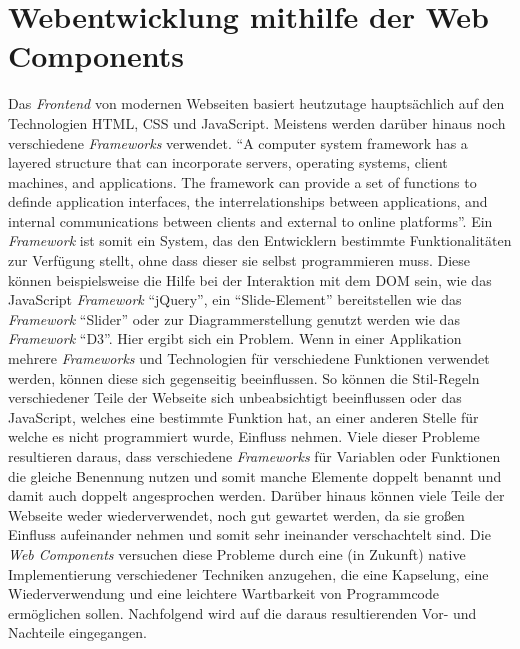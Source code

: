 \documentclass[12pt, paper=a4, bibtotoc, toc=listof, headsepline=true]{scrreprt}
\begin{document}
		\section{Webentwicklung mithilfe der Web Components}
		Das \emph{Frontend} von modernen Webseiten basiert heutzutage hauptsächlich auf den Technologien \ac{HTML}, \ac{CSS} und JavaScript. Meistens werden darüber hinaus noch verschiedene \emph{Frameworks} verwendet. \enquote{A computer system framework has a layered structure that can incorporate servers, operating systems, client machines, and applications. The framework can provide a set of functions to definde application interfaces, the interrelationships between applications, and internal communications between clients and external to online platforms}.\cite[S.15]{stuart2013roadmap} Ein \emph{Framework} ist somit ein System, das den Entwicklern bestimmte Funktionalitäten zur Verfügung stellt, ohne dass dieser sie selbst programmieren muss. Diese können beispielsweise die Hilfe bei der Interaktion mit dem \ac{DOM} sein, wie das JavaScript \emph{Framework} \enquote{jQuery}, ein \enquote{Slide-Element} bereitstellen wie das \emph{Framework} \enquote{Slider} oder zur Diagrammerstellung genutzt werden wie das \emph{Framework} \enquote{D3}. Hier ergibt sich ein Problem. Wenn in einer Applikation mehrere \emph{Frameworks} und Technologien für verschiedene Funktionen verwendet werden, können diese sich gegenseitig beeinflussen. So können die Stil-Regeln verschiedener Teile der Webseite sich unbeabsichtigt beeinflussen oder das JavaScript, welches eine bestimmte Funktion hat, an einer anderen Stelle für welche es nicht programmiert wurde, Einfluss nehmen. Viele dieser Probleme resultieren daraus, dass verschiedene \emph{Frameworks} für Variablen oder Funktionen die gleiche Benennung nutzen und somit manche Elemente doppelt benannt und damit auch doppelt angesprochen werden. Darüber hinaus können viele Teile der Webseite weder wiederverwendet, noch gut gewartet werden, da sie großen Einfluss aufeinander nehmen und somit sehr ineinander verschachtelt sind.
		Die \emph{Web Components} versuchen diese Probleme durch eine (in Zukunft) native Implementierung verschiedener Techniken anzugehen, die eine Kapselung, eine Wiederverwendung und eine leichtere Wartbarkeit von Programmcode ermöglichen sollen. Nachfolgend wird auf die daraus resultierenden Vor- und Nachteile eingegangen. 			
\end{document}
